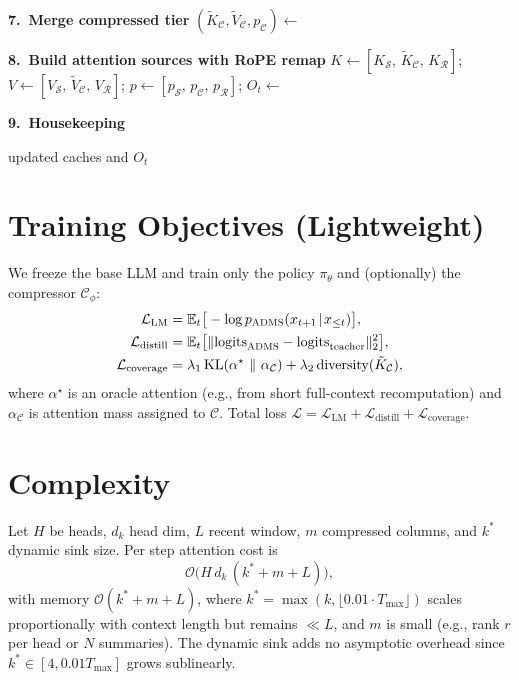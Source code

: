 \documentclass[11pt]{article}
\newcommand{\model}{\textsc{ADMS}} %
\newcommand{\sink}{\mathcal{S}}
\newcommand{\recent}{\mathcal{R}}
\newcommand{\compressed}{\mathcal{C}}
\begin{document}
\begin{algorithm}[H]
\textbf{7.~Merge compressed tier}\;
$(\tilde K_{\compressed}, \tilde V_{\compressed}, p_{\compressed}) \leftarrow$ \MergeCompressed{$\tilde K_{\compressed}, \tilde V_{\compressed}, p_{\compressed},\, \Delta \tilde K, \Delta \tilde V, p_{\Delta}$}\;

\textbf{8.~Build attention sources with RoPE remap}\;
$K \leftarrow [K_{\sink},\, \tilde K_{\compressed},\, K_{\recent}]$;\quad
$V \leftarrow [V_{\sink},\, \tilde V_{\compressed},\, V_{\recent}]$;\quad
$p \leftarrow [p_{\sink},\, p_{\compressed},\, p_{\recent}]$;\;
$O_t \leftarrow$  

\textbf{9.~Housekeeping}\;
\Housekeeping{$\compressed$} 

\Return updated caches and $O_t$\;
\end{algorithm}

\section{Training Objectives (Lightweight)}
We freeze the base LLM and train only the policy $\pi_\theta$ and (optionally) the compressor $\mathcal{C}_\phi$:
\begin{align}
\mathcal{L}_\text{LM} &= \mathbb{E}_{t}\big[-\log p_\text{\model}(x_{t+1}\!\mid\!x_{\le t})\big],\\
\mathcal{L}_\text{distill} &= \mathbb{E}_{t}\big[\|\mathrm{logits}_\text{\model}-\mathrm{logits}_\text{teacher}\|_2^2\big],\\
\mathcal{L}_\text{coverage} &= \lambda_1\, \mathrm{KL}\!\left(\alpha^\star\ \|\ \alpha_{\compressed}\right)+\lambda_2\, \text{diversity}(\tilde K_{\compressed}),
\end{align}
where $\alpha^\star$ is an oracle attention (e.g., from short full-context recomputation) and $\alpha_{\compressed}$ is attention mass assigned to $\compressed$. Total loss $\mathcal{L} = \mathcal{L}_\text{LM}+\mathcal{L}_\text{distill}+\mathcal{L}_\text{coverage}$.

\section{Complexity}
Let $H$ be heads, $d_k$ head dim, $L$ recent window, $m$ compressed columns, and $k^*$ dynamic sink size. Per step attention cost is
\[
\mathcal{O}\big(H\, d_k \,(k^* + m + L)\big),
\]
with memory $\mathcal{O}(k^* + m + L)$, where $k^* = \max(k, \lfloor 0.01 \cdot T_{\max}\rfloor)$ scales proportionally with context length but remains $\ll L$, and $m$ is small (e.g., rank $r$ per head or $N$ summaries). The dynamic sink adds no asymptotic overhead since $k^* \in [4, 0.01 T_{\max}]$ grows sublinearly.
\end{document}

